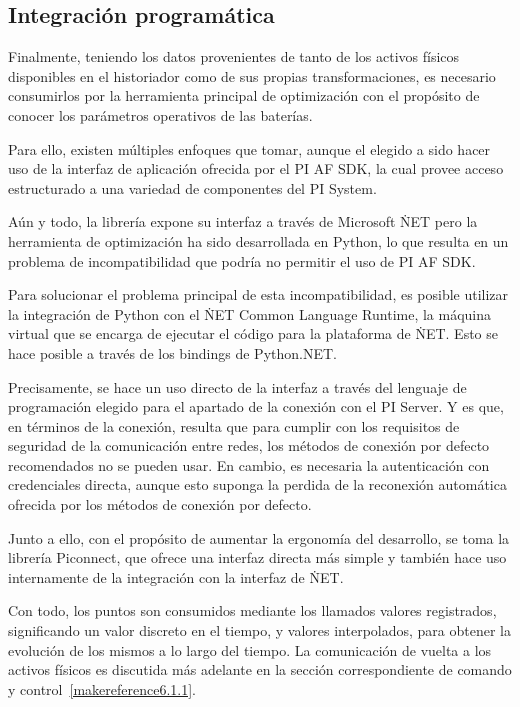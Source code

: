 \subsection{Integración programática}%
\label{makereference3.5.2}

Finalmente, teniendo los datos provenientes de tanto de los activos físicos disponibles en el historiador como de sus propias transformaciones, es necesario consumirlos por la herramienta principal de optimización con el propósito de conocer los parámetros operativos de las baterías.

Para ello, existen múltiples enfoques que tomar, aunque el elegido a sido hacer uso de la interfaz de aplicación ofrecida por el PI AF SDK, la cual provee acceso estructurado a una variedad de componentes del PI System.

Aún y todo, la librería expone su interfaz a través de Microsoft \.NET pero la herramienta de optimización ha sido desarrollada en Python, lo que resulta en un problema de incompatibilidad que podría no permitir el uso de PI AF SDK\@.

Para solucionar el problema principal de esta incompatibilidad, es posible utilizar la integración de Python con el \.NET Common Language Runtime, la máquina virtual que se encarga de ejecutar el código para la plataforma de \.NET\@. Esto se hace posible a través de los bindings de Python.NET\@.

Precisamente, se hace un uso directo de la interfaz a través del lenguaje de programación elegido para el apartado de la conexión con el PI Server. Y es que, en términos de la conexión, resulta que para cumplir con los requisitos de seguridad de la comunicación entre redes, los métodos de conexión por defecto recomendados no se pueden usar. En cambio, es necesaria la autenticación con credenciales directa, aunque esto suponga la perdida de la reconexión automática ofrecida por los métodos de conexión por defecto.

Junto a ello, con el propósito de aumentar la ergonomía del desarrollo, se toma la librería Piconnect, que ofrece una interfaz directa más simple y también hace uso internamente de la integración con la interfaz de \.NET\@.

Con todo, los puntos son consumidos mediante los llamados valores registrados, significando un valor discreto en el tiempo, y valores interpolados, para obtener la evolución de los mismos a lo largo del tiempo. La comunicación de vuelta a los activos físicos es discutida más adelante en la sección correspondiente de comando y control~\ref{makereference6.1.1}.
